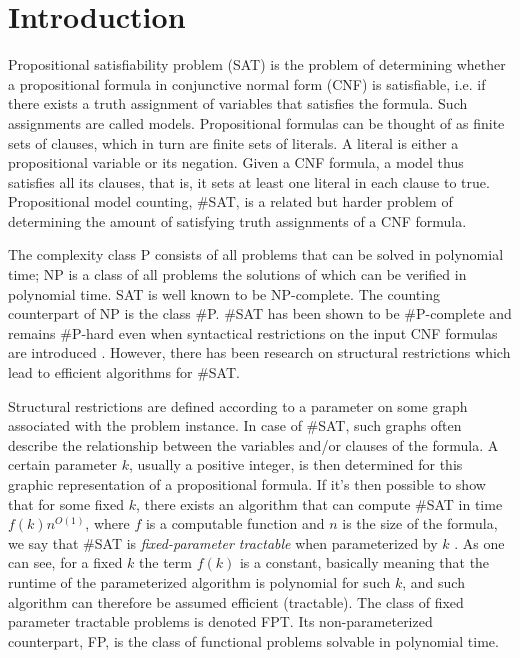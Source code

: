 \documentclass{article}
\begin{document}
\section{Introduction}

Propositional satisfiability problem (SAT) is the problem of determining whether a propositional formula in conjunctive normal form (CNF) is satisfiable, i.e. if there exists a truth assignment of variables that satisfies the formula.
Such assignments are called models.
Propositional formulas can be thought of as finite sets of clauses, which in turn are finite sets of literals.
A literal is either a propositional variable or its negation.
Given a CNF formula, a model thus satisfies all its clauses, that is, it sets at least one literal in each clause to true.
Propositional model counting, \#SAT, is a related but harder problem of determining the amount of satisfying truth assignments of a CNF formula.

The complexity class P consists of all problems that can be solved in polynomial time; NP is a class of all problems the solutions of which can be verified in polynomial time. SAT is well known to be NP-complete.
The counting counterpart of NP is the class \#P.
\#SAT has been shown to be \#P-complete and remains \#P-hard even when syntactical restrictions on the input CNF formulas are introduced \cite{DBLP:conf/sat/GanianS17}.
However, there has been research on structural restrictions \cite{DBLP:conf/sat/GanianS17, DBLP:conf/sat/CapelliDM14, DBLP:conf/sat/GanianPSSS22, DBLP:conf/sat/SaetherTV14, DBLP:journals/dam/FischerMR08, DBLP:journals/jda/SamerS10, DBLP:journals/fuin/GanianHO13} which lead to efficient algorithms for \#SAT.

Structural restrictions are defined according to a parameter on some graph associated with the problem instance.
In case of \#SAT, such graphs often describe the relationship between the variables and/or clauses of the formula.
A certain parameter $k$, usually a positive integer, is then determined for this graphic representation of a propositional formula. 
If it's then possible to show that for some fixed $k$, there exists an algorithm that can compute \#SAT in time $f(k)n^{O(1)}$, where $f$ is a computable function and $n$ is the size of the formula, we say that \#SAT is {\em fixed-parameter tractable} when parameterized by $k$ \cite{DBLP:conf/sat/GanianS17}.
As one can see, for a fixed $k$ the term $f(k)$ is a constant, basically meaning that the runtime of the parameterized algorithm is polynomial for such $k$, and such algorithm can therefore be assumed efficient (tractable). The class of fixed parameter tractable problems is denoted FPT.
Its non-parameterized counterpart, FP, is the class of functional problems solvable in polynomial time.
\end{document}
